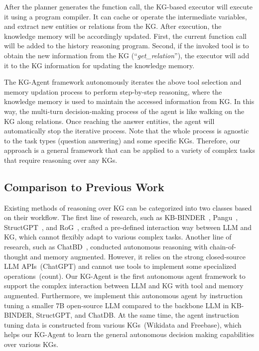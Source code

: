 After the planner generates the function call, the KG-based executor will execute it using a program compiler. It can cache or operate the intermediate variables, and extract new entities or relations from the KG. After execution, the knowledge memory will be accordingly updated. First, the current function call will be added to the history reasoning program. Second, if the invoked tool is to obtain the new information from the KG (\eg ``\emph{get\_relation}''), 
the executor will add it to the KG information for updating the knowledge memory.

The KG-Agent framework autonomously iterates the above tool selection and memory updation process to perform step-by-step reasoning, where the knowledge memory is used to maintain the accessed information from KG. 
In this way, the multi-turn decision-making process of the agent is like walking on the KG along relations.
Once reaching the answer entities, the agent will automatically stop the iterative process.
Note that the whole process is agnostic to the task types (\eg question answering) and some specific KGs. Therefore, our approach is a general framework that can be applied to a variety of complex tasks that require reasoning over any KGs.

\subsection{Comparison to Previous Work}

Existing methods of reasoning over KG can be categorized into two classes based on their workflow. The first line of research, such as KB-BINDER~\cite{Li-ICLKBQA-arXiv-23}, Pangu~\cite{Gu-ACL-23}, StructGPT~\cite{Jiang-2023-arxiv-StructGPT}, and RoG~\cite{Luo-arxiv-23-Reasoning}, crafted a pre-defined interaction way between LLM and KG, which cannot flexibly adapt to various complex tasks. Another line of research, such as ChatBD~\cite{ChatDB}, conducted autonomous reasoning with chain-of-thought and memory augmented. However, it relies on the strong closed-source LLM APIs~(\eg ChatGPT) and cannot use tools to implement some specialized operations~(\eg count). Our KG-Agent is the first autonomous agent framework to support the complex interaction between LLM and KG with tool and memory augmented. Furthermore, we implement this autonomous agent by instruction tuning a smaller 7B open-source LLM compared to the backbone LLM in KB-BINDER, StructGPT, and ChatDB.
At the same time, the agent instruction tuning data is constructed from various KGs~(\eg Wikidata and Freebase), which helps our KG-Agent to learn the general autonomous decision making capabilities over various KGs.